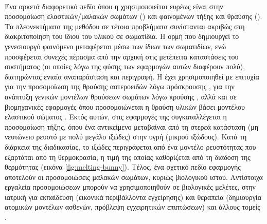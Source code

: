 \paragraph{} Ένα αρκετά διαφορετικό πεδίο όπου η  χρησιμοποιείται ευρέως είναι
στην προσομοίωση ελαστικών/μαλακών σωμάτων () και φαινομένων
τήξης και θραύσης (). Τα πλεονεκτήματα της μεθόδου σε τέτοια προβλήματα
συνίστανται ακριβώς στη διακριτοποίηση του ίδιου του υλικού σε σωματίδια. Η ορμή που
δημιουργεί το γενεσιουργό φαινόμενο μεταφέρεται μέσω των ίδιων των σωματιδίων, ενώ
προσφέρεται συνεχές πέρασμα από την αρχική στις μετέπειτα καταστάσεις του συστήματος (οι
οποίες λόγω της φύσης των εφαρμογών αυτών διαφέρουν πολύ), διατηρώντας ενιαία αναπαράσταση
και περιγραφή. Η  έχει χρησιμοποιηθεί με επιτυχία για την προσομοίωση της θραύσης
αστεροειδών λόγω πρόσκρουσης \cite{Benz199498}, για την ανάπτυξη γενικών μοντέλων θραύσεων
σωμάτων λόγω κρούσης \cite{Benz1995253}, αλλά και σε βιομηχανικές εφαρμογές όπου
προσομοιώνεται η θραύση υλικών βάσει μοντέλου ελαστικού σώματος \cite{Das201047}. Εκτός
αυτών, στις εφαρμογές της  συγκαταλλέγεται η προσομοίωση τήξης, όπου ένα
αντικείμενο μεταβαίναι από τη στερεά κατάσταση (μη νευτώνειο ρευστό με πολύ μεγάλο ιξώδες)
στην υγρή (μικρού ιξώδους). Κατά τη διάρκεια της διαδικασίας, το ιξώδες περιγράφεται από
ένα μοντέλο ρευστότητας που εξαρτάται από τη θερμοκρασία, η τιμή της οποίας καθορίζεται
από τη διάδοση της θερμότητας \cite{paiva2006particle} (εικόνα
\ref{fig:melting-bunny}). Τέλος, ένα σχετικό πεδίο εφαρμογής αποτελούν οι προσομοιώσεις
μαλακών σωμάτων, κυριώς βιολογικού ιστού. Αντίστοιχα εργαλεία προσομοιώσεων μπορούν να
χρησιμοποιηθούν σε βιολογικές μελέτες, στην ιατρική για εκπαίδευση (εικονικά περιβάλλοντα
εγχείρησης) και θεραπεία (δημιουργία ατομικών μοντέλων ασθενών, πρόβλεψη εγχειρητικών
επιπτώσεων) και άλλους τομείς \cite{Hieber20089195}.


